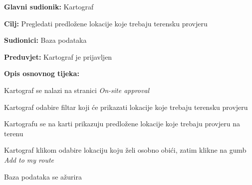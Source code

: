 					\noindent {}
					\begin{packed_item}
	
						\item \textbf{Glavni sudionik: }Kartograf
						\item  \textbf{Cilj:} Pregledati predložene lokacije koje trebaju terensku provjeru
						\item  \textbf{Sudionici:} Baza podataka
						\item  \textbf{Preduvjet:} Kartograf je prijavljen
						\item  \textbf{Opis osnovnog tijeka:}
						
						\item[] \begin{packed_enum}
	
							\item Kartograf se nalazi na stranici \textit{On-site approval}
							\item Kartograf odabire filtar koji će prikazati lokacije koje trebaju terensku provjeru
							\item Kartografu se na karti prikazuju predložene lokacije koje trebaju provjeru na terenu
							\item Kartograf klikom odabire lokaciju koju želi osobno obići, zatim klikne na gumb \textit{Add to my route}
							\item Baza podataka se ažurira

						\end{packed_enum}
						
					\end{packed_item}
					

